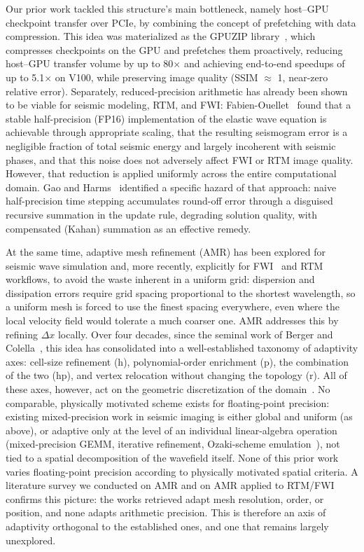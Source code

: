 \documentclass[12pt,a4paper]{article}
\begin{document}
Our prior work tackled this structure's main bottleneck, namely host--GPU
checkpoint transfer over PCIe, by combining the concept of prefetching with
data compression. This idea was materialized as the GPUZIP
library~\cite{maltempi2025checkpointing,gpuzip}, which compresses checkpoints
on the GPU and prefetches them proactively, reducing host--GPU transfer
volume by up to 80$\times$ and achieving end-to-end speedups of up to
5.1$\times$ on V100, while preserving image quality (SSIM $\approx$ 1,
near-zero relative error). Separately, reduced-precision arithmetic has
already been shown to be viable for seismic modeling, RTM, and FWI:
Fabien-Ouellet~\cite{fabienouellet2020half} found that a stable
half-precision (FP16) implementation of the elastic wave equation is
achievable through appropriate scaling, that the resulting seismogram error
is a negligible fraction of total seismic energy and largely incoherent with
seismic phases, and that this noise does not adversely affect FWI or RTM
image quality. However, that reduction is applied uniformly across the
entire computational domain. Gao and Harms~\cite{gao2023half} identified a
specific hazard of that approach: naive half-precision time stepping
accumulates round-off error through a disguised recursive summation in the
update rule, degrading solution quality, with compensated (Kahan) summation
as an effective remedy.

At the same time, adaptive mesh refinement (AMR) has been explored for
seismic wave simulation and, more recently, explicitly for
FWI~\cite{thrastarson2020wavefield2,takekawa2016adaptive} and
RTM~\cite{yang2024elasticrtm,lu2024nested,cho2019frequency,liu2020topography}
workflows, to avoid the waste inherent in a uniform grid: dispersion and
dissipation errors require grid spacing proportional to the shortest
wavelength, so a uniform mesh is forced to use the finest spacing
everywhere, even where the local velocity field would tolerate a much
coarser one. AMR addresses this by refining $\Delta x$ locally. Over four
decades, since the seminal work of Berger and Colella~\cite{berger1989amr},
this idea has consolidated into a well-established taxonomy of adaptivity
axes: cell-size refinement (h), polynomial-order enrichment (p), the
combination of the two (hp), and vertex relocation without changing the
topology (r). All of these axes, however, act on the geometric
discretization of the domain~\cite{vivarelli2025review}. No comparable,
physically motivated scheme exists for floating-point precision: existing
mixed-precision work in seismic imaging is either global and uniform (as
above), or adaptive only at the level of an individual linear-algebra
operation (mixed-precision GEMM, iterative refinement, Ozaki-scheme
emulation~\cite{ozaki2012errorfree}), not tied to a spatial decomposition of
the wavefield itself. None of this prior work varies floating-point
precision according to physically motivated spatial criteria. A literature
survey we conducted on AMR and on AMR applied to RTM/FWI confirms this
picture: the works retrieved adapt mesh resolution, order, or position, and
none adapts arithmetic precision. This is therefore an axis of adaptivity
orthogonal to the established ones, and one that remains largely
unexplored.
\end{document}
